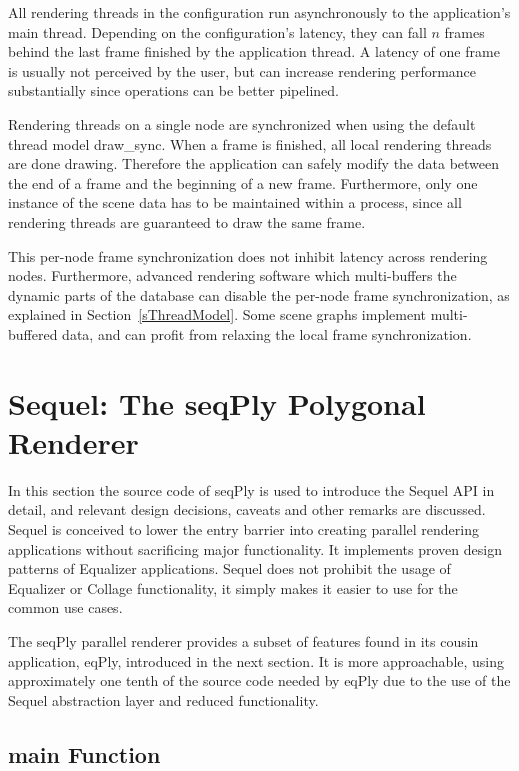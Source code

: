 \documentclass[10pt,a4]{scrartcl}
\newcommand{\sref}[1]{Section~\ref{#1}}
\begin{document}
All rendering threads in the configuration run asynchronously to the
application's main thread. Depending on the configuration's latency,
they can fall $n$ frames behind the last frame finished by the
application thread. A latency of one frame is usually not perceived by
the user, but can increase rendering performance substantially since
operations can be better pipelined.

Rendering threads on a single node are synchronized when using the
default thread model \textsf{draw\_sync}. When a frame is finished, all
local rendering threads are done drawing. Therefore the application can
safely modify the data between the end of a frame and the beginning of a
new frame. Furthermore, only one instance of the scene data has to be
maintained within a process, since all rendering threads are guaranteed
to draw the same frame.

This per-node frame synchronization does not inhibit latency across rendering
nodes. Furthermore, advanced rendering software which multi-buffers the dynamic
parts of the database can disable the per-node frame synchronization, as
explained in \sref{sThreadModel}. Some scene graphs implement multi-buffered
data, and can profit from relaxing the local frame synchronization.



\section{\label{sSeqPly}Sequel: The seqPly Polygonal Renderer}

In this section the source code of \textsf{seqPly} is used to introduce the
Sequel API in detail, and relevant design decisions, caveats and other remarks
are discussed. Sequel is conceived to lower the entry barrier into creating
parallel rendering applications without sacrificing major functionality. It
implements proven design patterns of Equalizer applications. Sequel does not
prohibit the usage of Equalizer or Collage functionality, it simply makes it
easier to use for the common use cases.

The \textsf{seqPly} parallel renderer provides a subset of features found in its
cousin application, \textsf{eqPly}, introduced in the next section. It is more
approachable, using approximately one tenth of the source code needed by
\textsf{eqPly} due to the use of the Sequel abstraction layer and reduced
functionality.


\subsection{main Function}
\end{document}
